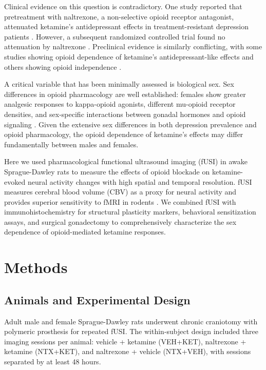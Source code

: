 \documentclass[11pt]{article}
\begin{document}
Clinical evidence on this question is contradictory. One study reported that pretreatment with naltrexone, a non-selective opioid receptor antagonist, attenuated ketamine's antidepressant effects in treatment-resistant depression patients \citep{williams2018}. However, a subsequent randomized controlled trial found no attenuation by naltrexone \citep{yoon2019}. Preclinical evidence is similarly conflicting, with some studies showing opioid dependence of ketamine's antidepressant-like effects and others showing opioid independence \citep{zanos2019}.

A critical variable that has been minimally assessed is biological sex. Sex differences in opioid pharmacology are well established: females show greater analgesic responses to kappa-opioid agonists, different mu-opioid receptor densities, and sex-specific interactions between gonadal hormones and opioid signaling \citep{mogil2012,craft2004}. Given the extensive sex differences in both depression prevalence and opioid pharmacology, the opioid dependence of ketamine's effects may differ fundamentally between males and females.

Here we used pharmacological functional ultrasound imaging (fUSI) in awake Sprague-Dawley rats to measure the effects of opioid blockade on ketamine-evoked neural activity changes with high spatial and temporal resolution. fUSI measures cerebral blood volume (CBV) as a proxy for neural activity and provides superior sensitivity to fMRI in rodents \citep{mace2011,deffieux2018}. We combined fUSI with immunohistochemistry for structural plasticity markers, behavioral sensitization assays, and surgical gonadectomy to comprehensively characterize the sex dependence of opioid-mediated ketamine responses.

\section{Methods}

\subsection{Animals and Experimental Design}

Adult male and female Sprague-Dawley rats underwent chronic craniotomy with polymeric prosthesis for repeated fUSI. The within-subject design included three imaging sessions per animal: vehicle + ketamine (VEH+KET), naltrexone + ketamine (NTX+KET), and naltrexone + vehicle (NTX+VEH), with sessions separated by at least 48 hours.
\end{document}
